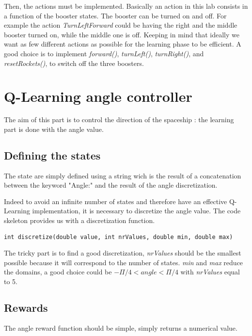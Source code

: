 Then, the actions must be implemented. Basically an action in
this lab consists in a function of the booster states. The booster can
be turned on and off. For example the action \textit{TurnLeftForward} could
be having the right and the middle booster turned on, while the middle one
is off.  Keeping in mind that ideally we want as few different actions as
possible for the learning phase to be efficient. A good choice is to
implement \textit{forward()}, \textit{turnLeft()}, \textit{turnRight()},
and \textit{resetRockets()}, to switch off the three boosters.

\section*{Q-Learning angle controller}

The aim of this part is to control the direction of the spaceship : the
learning part is done with the angle value.

\subsection*{Defining the states}

The state are simply defined using a string wich is the result of a
concatenation between the keyword "Angle:" and the result of the angle
discretization.

Indeed to avoid an infinite number of states and therefore have an
effective Q-Learning implementation, it is necessary to discretize the
angle value. The code skeleton provides us with a discretization function.

\lstset{language=Java} 
\begin{lstlisting} 
int discretize(double value, int nrValues, double min, double max)
\end{lstlisting}

The tricky part is to find a good discretization, \textit{nrValues} should
be the smallest possible because it will correspond to the number of
states. \textit{min} and \textit{max} reduce the domains, a good choice
could be $-\Pi/4<angle<\Pi/4$ with \textit{nrValues} equal to 5. 

\subsection*{Rewards}

The angle reward function should be simple, simply returns a numerical
value.


